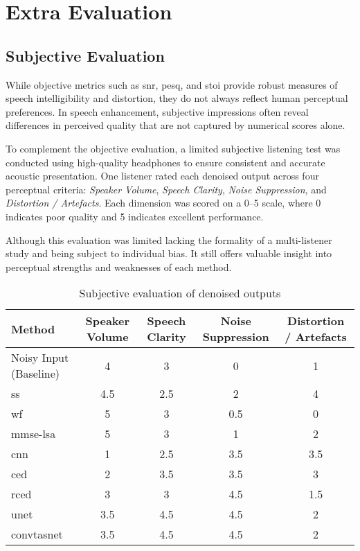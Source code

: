 \graphicspath{{content/appendices/figures}}
\chapter{Extra Evaluation}
\label{appendix:extra_evaluation}

\section{Subjective Evaluation}
\label{sec:subjective_evaluation}

While objective metrics such as \gls{snr}, \gls{pesq}, and \gls{stoi} provide robust measures of speech intelligibility and distortion, they do not always reflect human perceptual preferences. In speech enhancement, subjective impressions often reveal differences in perceived quality that are not captured by numerical scores alone.

To complement the objective evaluation, a limited subjective listening test was conducted using high-quality headphones to ensure consistent and accurate acoustic presentation. One listener rated each denoised output across four perceptual criteria: \textit{Speaker Volume}, \textit{Speech Clarity}, \textit{Noise Suppression}, and \textit{Distortion / Artefacts}. Each dimension was scored on a 0--5 scale, where 0 indicates poor quality and 5 indicates excellent performance.

Although this evaluation was limited lacking the formality of a multi-listener study and being subject to individual bias. It still offers valuable insight into perceptual strengths and weaknesses of each method.

\begin{table}[H]
\centering
\caption{Subjective evaluation of denoised outputs}
\label{tab:subjective_scores}
\begin{tabular}{|l|c|c|c|c|}
\hline
\textbf{Method} & \textbf{Speaker Volume} & \textbf{Speech Clarity} & \textbf{Noise Suppression} & \textbf{Distortion / Artefacts} \\
\hline
Noisy Input (Baseline) & 4 & 3 & 0 & 1 \\
\gls{ss}               & 4.5 & 2.5 & 2 & 4 \\
\gls{wf}               & 5 & 3 & 0.5 & 0 \\
\gls{mmse-lsa}         & 5 & 3 & 1 & 2 \\
\gls{cnn}              & 1 & 2.5 & 3.5 & 3.5 \\
\gls{ced}              & 2 & 3.5 & 3.5 & 3 \\
\gls{rced}             & 3 & 3 & 4.5 & 1.5 \\
\gls{unet}             & 3.5 & 4.5 & 4.5 & 2 \\
\gls{convtasnet}       & 3.5 & 4.5 & 4.5 & 2 \\
\hline
\end{tabular}
\end{table}

